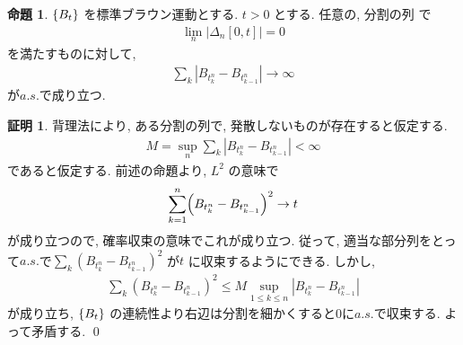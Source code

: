 \documentclass[10pt, fleqn, label-section=none]{bxjsarticle}
\theoremstyle{definition}
\newtheorem{prop}[dfn]{命題}
\newtheorem*{pf*}{証明}
\newcommand{\paren}[1]{\mleft( #1\mright )}
\newcommand{\cbra}[1]{\mleft\{#1\mright\}}
\newcommand{\abs}[1]{\left|#1\right|}
\renewcommand{\;}{\, ; \,}
\begin{document}
\begin{prop}
$\cbra{B_t}$ を標準ブラウン運動とする. $t > 0 $ とする. 任意の, 分割の列 で
\begin{align*} \lim_n \abs{\Delta_n [0,t]} = 0 \end{align*}
を満たすものに対して, 
\begin{align*} \sum_k \abs{B_{t^n_k } - B_{t^n_{k-1}}  }  \rightarrow  \infty   \end{align*}
が$a.s.$で成り立つ. 
\end{prop}
\begin{pf*}
背理法により, ある分割の列で, 発散しないものが存在すると仮定する. 
\begin{align*} M = \sup_n \sum_k \abs{B_{t^n_k } - B_{t^n_{k-1}}  }  < \infty    \end{align*}
であると仮定する. 前述の命題より, $L^2$ の意味で
\begin{align*} \sum_{k=1}^n \paren{B_{t^n_k} - B_{t^n_{k-1} } }^2 \rightarrow  t \end{align*}
が成り立つので, 確率収束の意味でこれが成り立つ. 従って, 適当な部分列をとって$a.s.$で$ \sum_k (B_{t^n_k} - B_{t^n_{k-1} } )^2 $ が$t$ に収束するようにできる.  しかし, 
\begin{align*} \sum_k (B_{t^n_k} - B_{t^n_{k-1} } )^2  \leq M \sup_{1 \leq k \leq n} \abs{B_{t^n_k} - B_{t^n_{k-1} } }         \end{align*}
が成り立ち, $\cbra{B_t}$ の連続性より右辺は分割を細かくすると$0$に$a.s.$で収束する. よって矛盾する. 
\qed
\end{pf*}
\end{document}
